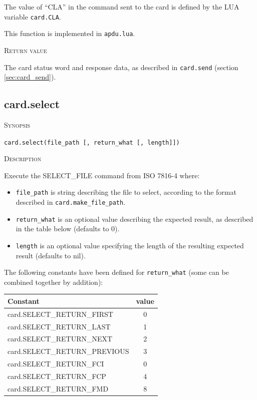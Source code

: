 \documentclass[11pt]{report}
\newcommand{\mansection}[1]{\vspace{0.5em}\par\noindent\textsc{#1}\vspace{0.5em}\par}
\newcommand{\syn}[1]{\texttt{#1}}
\begin{document}
  The value of ``CLA'' in the command sent to the card is defined by the LUA variable \syn{card.CLA}.

  This function is implemented in \syn{apdu.lua}.

\mansection{Return value}
  The card status word and response data, as described in \syn{card.send} (section \ref{sec:card_send}).


\subsection{card.select}

\mansection{Synopsis}
\syn{card.select(file\_path [, return\_what [, length]])}

\mansection{Description}
  Execute the SELECT\_FILE command from ISO 7816-4 where:
  \begin{itemize}
  \item{\syn{file\_path} is string describing the file to select, according to the format described in \syn{card.make\_file\_path}.}
  \item{\syn{return\_what} is an optional value describing the expected result, as described in the table below (defaults to 0).}
  \item{\syn{length} is an optional value specifying the length of the resulting expected result (defaults to nil).}
  \end{itemize}

  The following constants have been defined for \syn{return\_what} (some can be combined together by addition):

  \vspace{2em}
  \begin{tabular}{|l|c|}
  \hline
  Constant & value \\
  \hline
  card.SELECT\_RETURN\_FIRST      & 0 \\
  card.SELECT\_RETURN\_LAST       & 1 \\
  card.SELECT\_RETURN\_NEXT       & 2 \\
  card.SELECT\_RETURN\_PREVIOUS   & 3 \\
  card.SELECT\_RETURN\_FCI        & 0 \\
  card.SELECT\_RETURN\_FCP        & 4 \\
  card.SELECT\_RETURN\_FMD        & 8 \\
  \hline
  \end{tabular}
  \vspace{2em}
\end{document}
